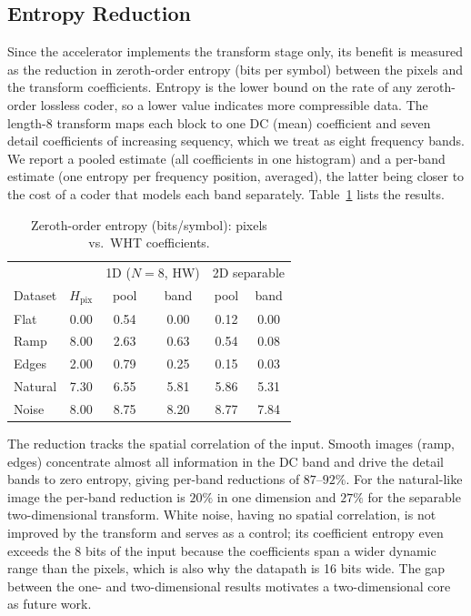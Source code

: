 \documentclass[conference]{IEEEtran}
\begin{document}
\subsection{Entropy Reduction}
Since the accelerator implements the transform stage only, its benefit is
measured as the reduction in zeroth-order entropy (bits per symbol) between the
pixels and the transform coefficients. Entropy is the lower bound on the rate of
any zeroth-order lossless coder, so a lower value indicates more compressible
data. The length-8 transform maps each block to one DC (mean) coefficient and
seven detail coefficients of increasing sequency, which we treat as eight
frequency bands. We report a pooled estimate (all coefficients in one histogram) and a
per-band estimate (one entropy per frequency position, averaged), the latter
being closer to the cost of a coder that models each band separately.
Table~\ref{tab:entropy} lists the results.

\begin{table}[htbp]
\caption{Zeroth-order entropy (bits/symbol): pixels vs.\ WHT coefficients.}
\label{tab:entropy}
\centering
\begin{tabular}{|l|c|cc|cc|}
\hline
 & & \multicolumn{2}{c|}{1D ($N{=}8$, HW)} & \multicolumn{2}{c|}{2D separable} \\
Dataset & $H_{\mathrm{pix}}$ & pool & band & pool & band \\
\hline
Flat    & 0.00 & 0.54 & 0.00 & 0.12 & 0.00 \\
Ramp    & 8.00 & 2.63 & 0.63 & 0.54 & 0.08 \\
Edges   & 2.00 & 0.79 & 0.25 & 0.15 & 0.03 \\
Natural & 7.30 & 6.55 & 5.81 & 5.86 & 5.31 \\
Noise   & 8.00 & 8.75 & 8.20 & 8.77 & 7.84 \\
\hline
\end{tabular}
\end{table}

The reduction tracks the spatial correlation of the input. Smooth images (ramp,
edges) concentrate almost all information in the DC band and drive the detail
bands to zero entropy, giving per-band reductions of $87$--$92\%$. For the
natural-like image the per-band reduction is $20\%$ in one dimension and $27\%$
for the separable two-dimensional transform. White noise, having no spatial
correlation, is not improved by the transform and serves as a control; its
coefficient entropy even exceeds the 8 bits of the input because the
coefficients span a wider dynamic range than the pixels, which is also why the
datapath is 16 bits wide. The gap
between the one- and two-dimensional results motivates a two-dimensional core as
future work.
\end{document}
